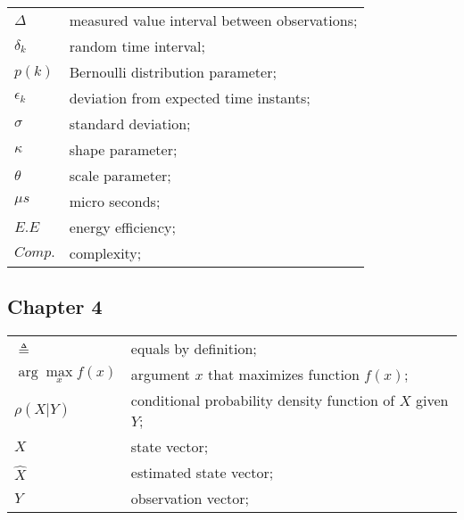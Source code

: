 \begin{longtable}{ll}
	$\Delta$				& measured value interval between observations; \\
	$\delta_k$				& random time interval; \\
	
	$p(k)$					& Bernoulli distribution parameter; \\
	$\epsilon_k$			& deviation from expected time instants; \\
	$\sigma$				& standard deviation; \\
	$\kappa$				& shape parameter; \\
	$\theta$				& scale parameter; \\
	
	$\mu s$					& micro seconds; \\
	$E.E$					& energy efficiency; \\
	$Comp.$					& complexity; \\

\end{longtable}


\subsection*{Chapter 4}

\begin{longtable}{ll}
	
	
	$\triangleq$			& equals by definition; \\	
	$\operatorname{arg}  
	\underset{x}
	{\operatorname{max}} 
					f(x)$	& argument $x$ that maximizes function $f(x)$; \\ 
					
	$\rho(X|Y)$				& conditional probability density function of $X$ given $Y$; \\
	$X$						& state vector; \\
	$\hat{X}$				& estimated state vector; \\
	$Y$						& observation vector; \\
	
%
	
	
\end{longtable}



